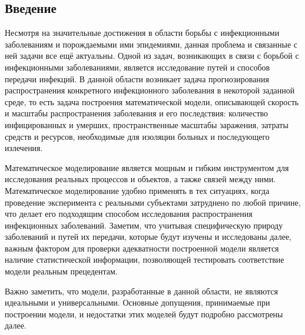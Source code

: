 \newpage
\parindent=1cm %
\begin{center}
	\section*{Введение} %
	\pagestyle{plain} %
	\setcounter{page}{3} %
\end{center}


Несмотря на  значительные достижения в области борьбы с инфекционными заболеваниям и порождаемыми ими эпидемиями, данная проблема и связанные с ней задачи все ещё актуальны. Одной из задач, возникающих в связи с борьбой с инфекционными заболеваниями, является исследование путей и способов передачи инфекций. В данной области возникает задача прогнозирования распространения конкретного инфекционного заболевания в некоторой заданной среде, то есть задача построения математической модели, описывающей скорость и масштабы распространения заболевания и его последствия: количество инфицированных и умерших, пространственные масштабы заражения, затраты средств и ресурсов,  необходимые для изоляции больных и последующего излечения. 

Математическое моделирование является мощным и гибким инструментом для исследования реальных процессов и объектов, а также связей между ними. Математическое моделирование удобно применять в тех ситуациях, когда проведение эксперимента с реальными субъектами затруднено по любой причине, что делает его подходящим способом исследования распространения инфекционных заболеваний. Заметим, что учитывая специфическую природу заболеваний и путей их передачи, которые будут изучены и исследованы далее,  важным фактором для проверки адекватности построенной модели является наличие статистической информации, позволяющей тестировать соответствие модели реальным прецедентам.

Важно заметить, что модели, разработанные в данной области, не являются идеальными и универсальными. Основные допущения, принимаемые при построении модели, и недостатки этих моделей будут подробно рассмотрены далее. 

